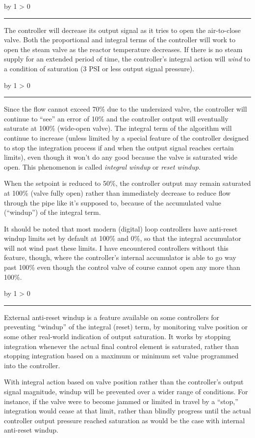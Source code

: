 \documentclass[12pt,a4paper]{article}
\def\svar{
           \advance\answnum by 1
           \ifnum \answnum > 0
                \hrule
                \vskip 3pt
                \leftline{Svar \the\answnum}
                \vskip 3pt \fi}
\begin{document}
\vskip 10pt \filbreak 
\svar{} 

The controller will decrease its output signal as it tries to open the air-to-close valve.  Both the proportional and integral terms of the controller will work to open the steam valve as the reactor temperature decreases.  If there is no steam supply for an extended period of time, the controller's integral action will {\it wind} to a condition of saturation (3 PSI or less output signal pressure).

\vskip 10pt \filbreak 
\svar{} 

Since the flow cannot exceed 70\% due to the undersized valve, the controller will continue to ``see'' an error of 10\% and the controller output will eventually saturate at 100\% (wide-open valve).  The integral term of the algorithm will continue to increase (unless limited by a special feature of the controller designed to stop the integration process if and when the output signal reaches certain limits), even though it won't do any good because the valve is saturated wide open.  This phenomenon is called {\it integral windup} or {\it reset windup}.

When the setpoint is reduced to 50\%, the controller output may remain saturated at 100\% (valve fully open) rather than immediately decrease to reduce flow through the pipe like it's supposed to, because of the accumulated value (``windup'') of the integral term. 

\vskip 10pt

It should be noted that most modern (digital) loop controllers have anti-reset windup limits set by default at 100\% and 0\%, so that the integral accumulator will not wind past these limits.  I have encountered controllers without this feature, though, where the controller's internal accumulator is able to go way past 100\% even though the control valve of course cannot open any more than 100\%.

\vskip 10pt \filbreak 
\svar{} 

External anti-reset windup is a feature available on some controllers for preventing ``windup'' of the integral (reset) term, by monitoring valve position or some other real-world indication of output saturation.  It works by stopping integration whenever the actual final control element is saturated, rather than stopping integration based on a maximum or minimum set value programmed into the controller.

\vskip 10pt

With integral action based on valve position rather than the controller's output signal magnitude, windup will be prevented over a wider range of conditions.  For instance, if the valve were to become jammed or limited in travel by a ``stop,'' integration would cease at that limit, rather than blindly progress until the actual controller output pressure reached saturation as would be the case with internal anti-reset windup.
\end{document}
